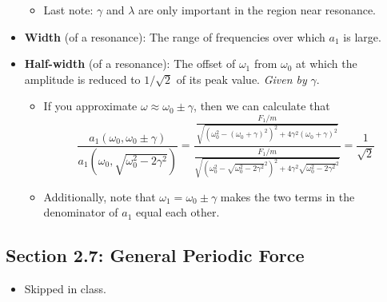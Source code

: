 \documentclass[../notes.tex]{subfiles}
\begin{document}
\begin{itemize}
\begin{itemize}
        \item Last note: $\gamma$ and $\lambda$ are only important in the region near resonance.
    \end{itemize}
    \item \textbf{Width} (of a resonance): The range of frequencies over which $a_1$ is large.
    \item \textbf{Half-width} (of a resonance): The offset of $\omega_1$ from $\omega_0$ at which the amplitude is reduced to $1/\sqrt{2}$ of its peak value. \emph{Given by} $\gamma$.
    \begin{itemize}
        \item If you approximate $\omega\approx\omega_0\pm\gamma$, then we can calculate that
        \begin{equation*}
            \frac{a_1(\omega_0,\omega_0\pm\gamma)}{a_1(\omega_0,\sqrt{\omega_0^2-2\gamma^2})} = \frac{\frac{F_1/m}{\sqrt{(\omega_0^2-(\omega_0+\gamma)^2)^2+4\gamma^2(\omega_0+\gamma)^2}}}{\frac{F_1/m}{\sqrt{\left( \omega_0^2-\sqrt{\omega_0^2-2\gamma^2}^2 \right)^2+4\gamma^2\sqrt{\omega_0^2-2\gamma^2}^2}}}
            = \frac{1}{\sqrt{2}}
        \end{equation*}
        \item Additionally, note that $\omega_1=\omega_0\pm\gamma$ makes the two terms in the denominator of $a_1$ equal each other.
    \end{itemize}
\end{itemize}


\subsection*{Section 2.7: General Periodic Force}
\begin{itemize}
    \item {}Skipped in class.
\end{itemize}
\end{document}
